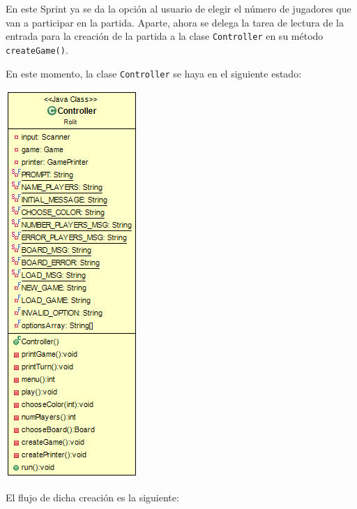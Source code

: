 \documentclass[../DocumentoOficial.tex]{subfiles}
\begin{document}
\newpage
\begin{sprint}[2]
En este Sprint ya se da la opción al usuario de elegir el número de jugadores que van a participar en la partida. Aparte, ahora se delega la tarea de lectura de la entrada para la creación de la partida a la clase \texttt{Controller} en su método \texttt{createGame()}. 

En este momento, la clase \texttt{Controller} se haya en el siguiente estado:

\begin{center}
\includegraphics[scale=1]{Controller-sprint2.png} 
\end{center}

\newpage
El flujo de dicha creación es la siguiente:


\end{sprint}
\end{document}

